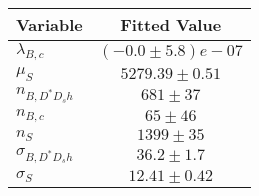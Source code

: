 \begin{tabular}[t]{lc}
\hline
Variable &Fitted Value\\
\hline\hline
$\lambda_{B,c}$&$(-0.0\pm5.8)e-07$\\
\hline
$\mu_S$&$5279.39\pm0.51$\\
\hline
$n_{B, D^* D_s h}$&$681\pm37$\\
\hline
$n_{B,c}$&$65\pm46$\\
\hline
$n_S$&$1399\pm35$\\
\hline
$\sigma_{B, D^* D_s h}$&$36.2\pm1.7$\\
\hline
$\sigma_S$&$12.41\pm0.42$\\
\hline
\end{tabular}